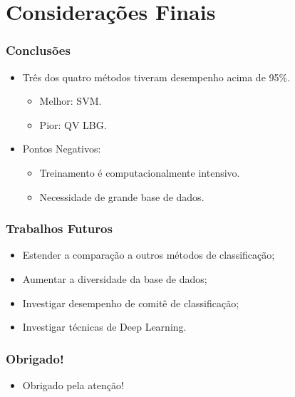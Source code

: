 \documentclass{beamer}
\begin{document}
\section{Considerações Finais}

\begin{frame}

	\frametitle{Conclusões}
	
	\begin{itemize}
		\setlength\itemsep{1em}
		
		\item Três dos quatro métodos tiveram desempenho acima de 95\%.
		\begin{itemize}
			\item Melhor: SVM.
			\item Pior: QV LBG.
		\end{itemize}
		\item Pontos Negativos:
		\begin{itemize}
			\item Treinamento é computacionalmente intensivo.
			\item Necessidade de grande base de dados.
		\end{itemize}
	\end{itemize}


\end{frame}

\begin{frame}

	\frametitle{Trabalhos Futuros}
	
	\begin{itemize}
		\setlength\itemsep{1em}
		
		\item Estender a comparação a outros métodos de classificação;
        \item Aumentar a diversidade da base de dados;
		\item Investigar desempenho de comitê de classificação;
        \item Investigar técnicas de Deep Learning.
	
	\end{itemize}


\end{frame}


\begin{frame}
	\frametitle{Obrigado!}
    
    \centering
    
    \begin{itemize}
    	\setlength\itemsep{2em}
		\item Obrigado pela atenção!
	\end{itemize}

\end{frame}
\end{document}
